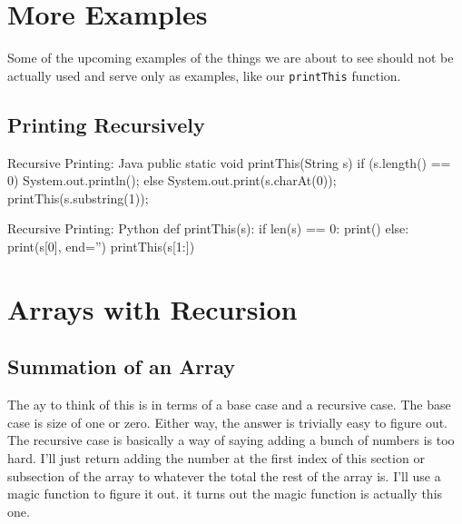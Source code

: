 \section{More Examples}
Some of the upcoming examples  of the things we are about to see should not be actually  used and serve only as examples, like our \texttt{printThis} function.

\subsection{Printing Recursively}

\begin{javacode}{Recursive Printing: Java}
public static void printThis(String s){
	if (s.length() == 0) {
		System.out.println();
	} else {
		System.out.print(s.charAt(0));
		printThis(s.substring(1));
	}
}
\end{javacode}

\begin{pycode}{Recursive Printing: Python}
def printThis(s):
	if len(s) == 0:
		print()
	else:
		print(s[0], end='')
		printThis(s[1:])
\end{pycode}


\section{Arrays with Recursion}


\subsection{Summation of an Array}
%
%


The ay to think of this is in terms of a base case and a recursive case.  The base case is size of one or zero.  Either way, the answer is trivially easy to figure out.  The recursive case is basically a way of saying adding a bunch of numbers is too hard.  I'll just return adding the number at the first index of this section or subsection of the array to whatever the total the rest of the array is.  I'll use a magic function to figure it out.  it turns out the magic function is actually this one.


